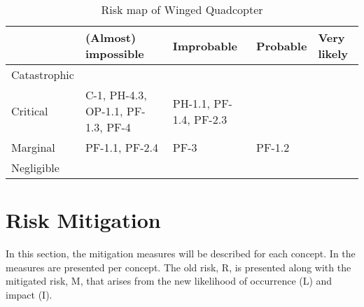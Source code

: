 \begin{table}[H]
    \centering
    \caption{Risk map of Winged Quadcopter}
    \label{tab:risk_map_wing_quad}
    \begin{tabular}{p{2.5cm}p{2.5cm}p{2.5cm}p{2.5cm}p{2.5cm}}
    \toprule
                    & (Almost) impossible                                       & Improbable                                    & Probable                          & Very likely
    \\ \midrule
    Catastrophic    &\cellcolor[HTML]{d9ead3}                                   &\cellcolor[HTML]{fff2cc}                       &\cellcolor[HTML]{f4cccc}           &\cellcolor[HTML]{f4cccc}
    \\ \hdashline
    Critical        &\cellcolor[HTML]{d9ead3} C-1, PH-4.3, OP-1.1, PF-1.3, PF-4     &\cellcolor[HTML]{fff2cc} PH-1.1, PF-1.4, PF-2.3  &\cellcolor[HTML]{fff2cc}           &\cellcolor[HTML]{f4cccc}
    \\ \hdashline
    Marginal        &\cellcolor[HTML]{d9ead3} PF-1.1, PF-2.4                     &\cellcolor[HTML]{d9ead3}  PF-3                 &\cellcolor[HTML]{fff2cc} PF-1.2    &\cellcolor[HTML]{fff2cc}
    \\ \hdashline
    Negligible      &\cellcolor[HTML]{d9ead3}                                   &\cellcolor[HTML]{d9ead3}                       &\cellcolor[HTML]{d9ead3}           &\cellcolor[HTML]{d9ead3}
    \\ \bottomrule
    \end{tabular}
\end{table}










\section{Risk Mitigation}

In this section, the mitigation measures will be described for each concept. In  the measures are presented per concept. The old risk, R, is presented along with the mitigated risk, M, that arises from the new likelihood of occurrence (L) and impact (I).

